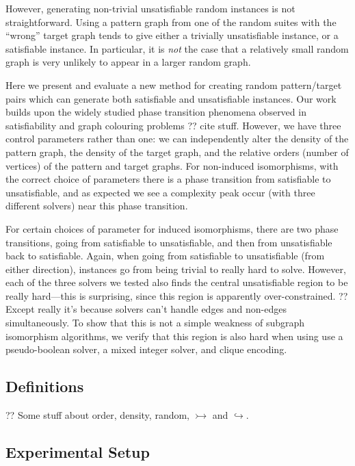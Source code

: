 \documentclass[letterpaper]{article}
\begin{document}
However, generating non-trivial unsatisfiable random instances is not straightforward. Using a
pattern graph from one of the random suites with the ``wrong'' target graph tends to give either a
trivially unsatisfiable instance, or a satisfiable instance. In particular, it is \emph{not} the
case that a relatively small random graph is very unlikely to appear in a larger random graph.

Here we present and evaluate a new method for creating random pattern/target pairs which can
generate both satisfiable and unsatisfiable instances. Our work builds upon the widely studied phase
transition phenomena observed in satisfiability and graph colouring problems ?? cite stuff. However,
we have three control parameters rather than one: we can independently alter the density of the
pattern graph, the density of the target graph, and the relative orders (number of vertices) of the
pattern and target graphs.  For non-induced isomorphisms, with the correct choice of parameters
there is a phase transition from satisfiable to unsatisfiable, and as expected we see a complexity
peak occur (with three different solvers) near this phase transition.

For certain choices of parameter for induced isomorphisms, there are two phase transitions, going
from satisfiable to unsatisfiable, and then from unsatisfiable back to satisfiable. Again, when
going from satisfiable to unsatisfiable (from either direction), instances go from being trivial to
really hard to solve. However, each of the three solvers we tested also finds the central
unsatisfiable region to be really hard---this is surprising, since this region is apparently
over-constrained. ?? Except really it's because solvers can't handle edges and non-edges
simultaneously. To show that this is not a simple weakness of subgraph isomorphism algorithms, we
verify that this region is also hard when using use a pseudo-boolean solver, a mixed integer solver,
and clique encoding.

\subsection{Definitions}

?? Some stuff about order, density, random, $\rightarrowtail$ and $\hookrightarrow$.

\lipsum[2]

\subsection{Experimental Setup}
\end{document}
